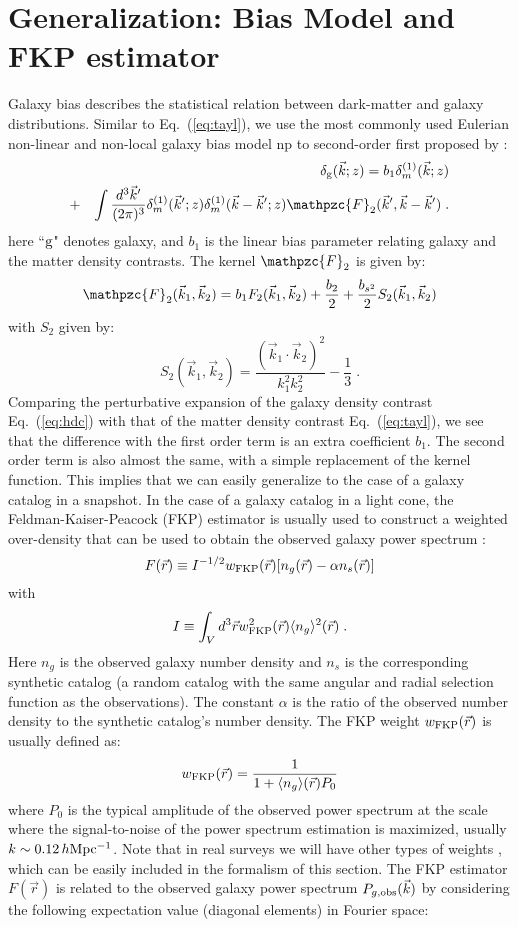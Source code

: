 \documentclass[prd,amsmath,amssymb,floatfix,superscriptaddress,nofootinbib,twocolumn]{revtex4-1}
\def\be{\begin{equation}}
\def\ee{\end{equation}}
\def\bea{\begin{eqnarray}}
\def\eea{\end{eqnarray}}
\newcommand{\vk}{\vec{k}}
\newcommand{\ec}[1]{Eq.~(\ref{eq:#1})}
\newcommand{\eql}[1]{\label{eq:#1}}
\begin{document}
\section{Generalization: Bias Model and FKP estimator} \label{sec3}
Galaxy bias describes the statistical relation between dark-matter and galaxy distributions. Similar to \ec{tayl}, we use the most commonly used Eulerian
non-linear and non-local galaxy bias model np to second-order first
proposed by \cite{McDonald:2009dh}: \bea &&\delta_{\rm g}(\vec{k};z) =
b_1\delta^{(1)}_m (\vec{k};z)\nonumber \\ &+&\int
\frac{d^{3}\vec{k}'}{(2\pi)^3}\delta^{(1)}_{m}(\vec{k}';z)\delta^{(1)}_{m}(\vec{k}-\vec{k}';z)\mathpzc{F}_{2}(\vec{k}',\vec{k}-\vec{k}')
\;. \eql{hdc} \eea here ``$\rm g$" denotes galaxy, and $b_{1}$ is the
linear bias parameter relating galaxy and the matter density
contrasts. The kernel $\mathpzc{F}_2$ is given by: \be
\mathpzc{F}_2(\vk_1,\vk_2)=b_1F_{2}(\vk_1,\vk_2)+\frac{b_2}{2}+\frac{b_{s^2}}{2}S_{2}(\vk_1,\vk_2)
\ee with $S_2$ given by: \be S_{2}(\vk_1,\vk_2)=\frac{(\vk_1\cdot
  \vk_2)^2}{k_1^2k_2^2}-\frac{1}{3}\;.  \ee
Comparing the perturbative
expansion of the galaxy density contrast \ec{hdc} with that of the matter
density contrast \ec{tayl}, we see that the difference with the first
order term is an extra coefficient $b_1$.  The second order term is
also almost the same, with a simple replacement of the kernel function. This
implies that we can easily generalize to the case of a galaxy catalog
in a snapshot. In the case of a galaxy catalog in a light cone,
the Feldman-Kaiser-Peacock (FKP) estimator is usually used to construct a weighted over-density that can be used to obtain
the observed galaxy power spectrum \cite{Feldman:1993ky}: \be
F(\vec{r})\equiv I^{-1/2}w_{\rm FKP}(\vec{r})[n_{g}(\vec{r})-\alpha
  n_{s}(\vec{r})] \ee with \be I\equiv\int_{V} d^{3}\vec{r}w_{\rm
  FKP}^{2}(\vec{r})\langle n_{ g}\rangle^{2}(\vec{r})\;.  \ee Here
$n_{g}$ is the observed galaxy number density and $n_{s}$ is the
corresponding synthetic catalog (a random catalog with the same angular and
radial selection function as the observations). The constant $\alpha$ is the ratio of
the observed number density to the synthetic catalog's number
density. The FKP weight $w_{\rm FKP}(\vec{r})$ is usually defined as:
\begin{eqnarray}
w_{\rm FKP}(\vec{r})=\frac{1}{1+\langle n_{g}\rangle (\vec{r})P_{0}}
\end{eqnarray}
where $P_0$ is the typical amplitude of the observed power spectrum at the scale where the signal-to-noise of the power spectrum estimation is maximized, usually $k\sim 0.12\,h \rm Mpc^{-1}$. Note that in real surveys we will have other types of weights \cite{Gil-Marin:2014sta}\cite{Gil-Marin:2018cgo}, which can be easily included in the formalism of this section. The FKP estimator $F(\vec{r})$ is related to the observed galaxy power spectrum $P_{g,\rm obs}(\vec{k})$ by considering the following expectation value (diagonal elements) in Fourier space:
\end{document}
